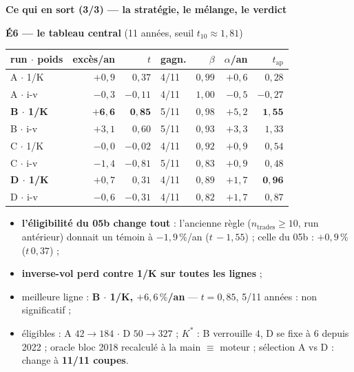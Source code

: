 \documentclass[10pt,a4paper,landscape]{article}
\begin{document}
\newpage
\begin{center}
{\Large\bfseries Ce qui en sort (3/3) --- la stratégie, le mélange, le verdict}
\end{center}

\noindent\begin{minipage}[t]{0.49\textwidth}\vspace{0pt}
\textbf{\textcolor{bleu}{É6 --- le tableau central}} {\scriptsize (11 années, seuil $t_{10} \approx 1{,}81$)}
\begin{center}\scriptsize
\begin{tabular}{@{}lrrlrrr@{}}
\toprule
run $\cdot$ poids & excès/an & $t$ & gagn. & $\beta$ & $\alpha$/an & $t_{\text{ap}}$ \\
\midrule
A $\cdot$ 1/K & $+0{,}9$ & $0{,}37$ & 4/11 & $0{,}99$ & $+0{,}6$ & $0{,}28$ \\
A $\cdot$ i-v & $-0{,}3$ & $-0{,}11$ & 4/11 & $1{,}00$ & $-0{,}5$ & $-0{,}27$ \\
\textbf{B $\cdot$ 1/K} & $\mathbf{+6{,}6}$ & $\mathbf{0{,}85}$ & 5/11 & $0{,}98$ & $+5{,}2$ & $\mathbf{1{,}55}$ \\
B $\cdot$ i-v & $+3{,}1$ & $0{,}60$ & 5/11 & $0{,}93$ & $+3{,}3$ & $1{,}33$ \\
C $\cdot$ 1/K & $-0{,}0$ & $-0{,}02$ & 4/11 & $0{,}92$ & $+0{,}9$ & $0{,}54$ \\
C $\cdot$ i-v & $-1{,}4$ & $-0{,}81$ & 5/11 & $0{,}83$ & $+0{,}9$ & $0{,}48$ \\
\textbf{D $\cdot$ 1/K} & $+0{,}7$ & $0{,}31$ & 4/11 & $0{,}89$ & $+1{,}7$ & $\mathbf{0{,}96}$ \\
D $\cdot$ i-v & $-0{,}6$ & $-0{,}31$ & 4/11 & $0{,}82$ & $+1{,}7$ & $0{,}87$ \\
\bottomrule
\end{tabular}
\end{center}
\begin{itemize}
\item[--] \textbf{l'éligibilité du 05b change tout} : l'ancienne règle ($n_{\text{trades}} \ge 10$, run antérieur) donnait un témoin à $-1{,}9\,\%$/an ($t\,{-}1{,}55$) ; celle du 05b : $+0{,}9\,\%$ ($t\,0{,}37$) ;
\item[--] \textbf{inverse-vol perd contre 1/K sur toutes les lignes} ;
\item[--] meilleure ligne : \textbf{B $\cdot$ 1/K, $+6{,}6\,\%$/an} --- $t = 0{,}85$, 5/11 années : non significatif ;
\item[--] éligibles : A $42 \to 184$ $\cdot$ D $50 \to 327$ ; $K^*$ : B verrouille $4$, D se fixe à $6$ depuis 2022 ; oracle bloc 2018 recalculé à la main $\equiv$ moteur \checkmark ; sélection A vs D : change à \textbf{11/11 coupes}.

\end{itemize}
\end{minipage}
\end{document}
